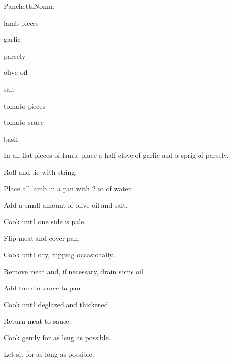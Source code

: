 \begin{recipe}{Panchetta}{Nonna}{}

\begin{ingredients}
\item lamb pieces
\item garlic
\item parsely
\item olive oil
\item salt
\item tomato pieces
\item tomato sauce
\item basil
\end{ingredients}

\begin{directions}
\item In all flat pieces of lamb, place a half clove of garlic and a sprig of parsely.
\item Roll and tie with string.
\item Place all lamb in a pan with 2 to  of water.
\item Add a small amount of olive oil and salt.
\item Cook until one side is pale.
\item Flip meat and cover pan.
\item Cook until dry, flipping occasionally.
\item Remove meat and, if necessary, drain some oil.
\item Add tomato sauce to pan.
\item Cook until deglazed and thickened.
\item Return meat to sauce.
\item Cook gently for as long as possible.
\item Let sit for as long as possible.
\end{directions}

\end{recipe}
